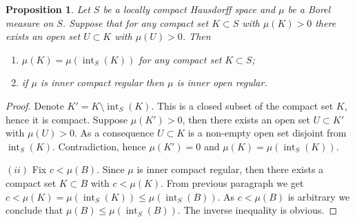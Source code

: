 \documentclass[12pt]{article}
\newtheorem{proposition}[theorem]{Proposition}
\begin{document}
\begin{proposition}\label{NormalMeasCharac} Let $S$ be a locally compact
    Hausdorff space and $\mu$ be a Borel measure on $S$. Suppose that for any
    compact set $K\subset S$ with $\mu(K)>0$ there exists an open set $U\subset
        K$ with $\mu(U)>0$. Then
    \begin{enumerate}[label = (\roman*)]
        \item $\mu(K)=\mu(\operatorname{int}_S(K))$ for any compact set
              $K\subset S$;
        \item if $\mu$ is inner compact regular then $\mu$ is inner open
              regular.
    \end{enumerate}
\end{proposition}
\begin{proof} Denote $K'=K\setminus \operatorname{int}_S(K)$. This is a closed
    subset of the compact set $K$, hence it is compact. Suppose $\mu(K')>0$,
    then there exists an open set $U\subset K'$ with $\mu(U)>0$. As a
    consequence $U\subset K$ is a non-empty open set disjoint from
    $\operatorname{int}_S(K)$. Contradiction, hence $\mu(K')=0$ and
    $\mu(K)=\mu(\operatorname{int}_S(K))$.

    $(ii)$ Fix $c<\mu(B)$. Since $\mu$ is inner compact regular, then there
    exists a compact set $K\subset B$ with $c<\mu(K)$. From previous paragraph
    we get
    $c<\mu(K)=\mu(\operatorname{int}_S(K))\leq\mu(\operatorname{int}_S(B))$. As
    $c<\mu(B)$ is arbitrary we conclude that
    $\mu(B)\leq\mu(\operatorname{int}_S(B))$. The inverse inequality is obvious.
\end{proof}
\end{document}
